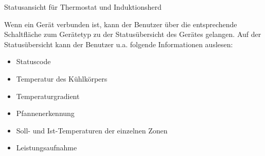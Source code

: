 {
}
\caption{Statusansicht für Thermostat und Induktionsherd}
Wenn ein Gerät verbunden ist, kann der Benutzer über die entsprechende Schaltfläche zum Gerätetyp zu der Statusübersicht des Gerätes gelangen. Auf der Statusübersicht kann der Benutzer u.a. folgende Informationen auslesen:
\begin{itemize}
\item Statuscode
\item Temperatur des Kühlkörpers
\item Temperaturgradient
\item Pfannenerkennung
\item Soll- und Ist-Temperaturen der einzelnen Zonen
\item Leistungsaufnahme
\end{itemize}

